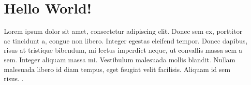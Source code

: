 \documentclass{article}
\begin{document}
\section{Hello World!}

Lorem ipsum dolor sit amet, consectetur adipiscing elit. Donec sem ex, porttitor ac tincidunt a, congue non libero. Integer egestas eleifend tempor. Donec dapibus, risus at tristique bibendum, mi lectus imperdiet neque, ut convallis massa sem a sem. Integer aliquam massa mi. Vestibulum malesuada mollis blandit. Nullam malesuada libero id diam tempus, eget feugiat velit facilisis. Aliquam id sem risus. \cite{dude2022stuff}.

\begin{figure}
    
\end{figure}

\lstset{language=Python3, style=pythonstyle}




\end{document}
